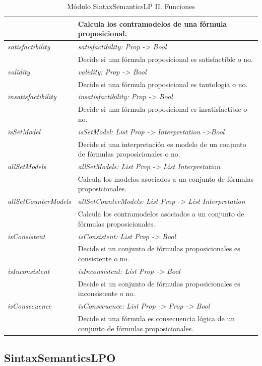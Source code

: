 \documentclass[a4paper]{report}
\begin{document}
\begin{table}[H]
\begin{tabular}{p{3cm} p{13.2cm}}
& Calcula los contramodelos de una fórmula proposicional.\\
\hline
\textit{satisfactibility}& \textit{satisfactibility: Prop -> Bool}\\
& Decide si una fórmula proposicional es satisfactible o no.\\
\hline
\textit{validity}& \textit{validity: Prop -> Bool}\\
& Decide si una fórmula proposicional es tautología o no.\\
\hline
\textit{insatisfactibility}& \textit{insatisfactibility: Prop -> Bool}\\
& Decide si una fórmula proposicional es insatisfactible o no.\\
\hline
\textit{isSetModel}& \textit{isSetModel: List Prop -> Interpretation ->Bool}\\
& Decide si una interpretación es modelo de un conjunto de fórmulas proposicionales o no.\\
\hline
\textit{allSetModels}& \textit{allSetModels: List Prop -> List Interpretation}\\
& Calcula los modelos asociados a un conjunto de fórmulas proposicionales.\\
\hline
\textit{allSetCounterModels}& \textit{allSetCounterModels: List Prop -> List Interpretation}\\
& Calcula los contramodelos asociados a un conjunto de fórmulas proposicionales.\\
\hline
\textit{isConsistent}& \textit{isConsistent: List Prop -> Bool}\\
& Decide si un conjunto de fórmulas proposicionales es consistente o no.\\
\hline
\textit{isInconsistent}& \textit{isInconsistent: List Prop -> Bool}\\
& Decide si un conjunto de fórmulas proposicionales es inconsistente o no.\\
\hline
\textit{isConsecuence}& \textit{isConsecuence: List Prop -> Prop -> Bool}\\
& Decide si una fórmula es consecuencia lógica de un conjunto de fórmulas proposicionales.\\
\hline
\end{tabular}
\caption{Módulo SintaxSemanticsLP II. Funciones}
\end{table}

\newpage
\subsection{SintaxSemanticsLPO}
\toDo
\end{document}
